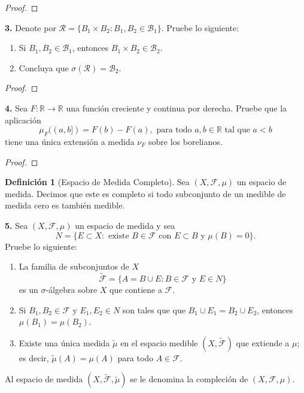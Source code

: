 \documentclass{article}
\newenvironment{statement}[1]{\smallskip\noindent\color[rgb]{1.00,0.00,0.50} {\bf #1.}}{}
\theoremstyle{definition}
\newtheorem{defn}[theorem]{Definici\'on}
\theoremstyle{remark}
\newcommand{\BR}{\mathbb R}
\begin{document}
\begin{proof}
\end{proof}

\begin{statement}{3}
  Denote por $\mathcal{R} = \{B_1 \times B_2 : B_1, B_2 \in \mathcal{B}_1\}$.
  Pruebe lo siguiente:
  \begin{enumerate}
    \item Si $B_1, B_2 \in \mathcal{B}_1$, entonces $B_1 \times B_2 \in \mathcal{B}_2$.
    \item Concluya que $\sigma(\mathcal{R}) = \mathcal{B}_2$.
  \end{enumerate}
\end{statement}

\begin{proof}
\end{proof}

\begin{statement}{4}
  Sea $F: \BR \to \BR$ una funci\'on creciente y continua por derecha.
  Pruebe que la aplicaci\'on
  \[
    \mu_F((a, b]) = F(b) - F(a), \text{ para todo } a, b \in \BR \text{ tal que } a < b
  \]
  tiene una \'unica extensi\'on a medida $\nu_F$ sobre los borelianos.
\end{statement}

\begin{proof}
\end{proof}

\begin{defn}[Espacio de Medida Completo]
  Sea $(X, \mathcal{F}, \mu)$ un espacio de medida. Decimos que este es completo
  si todo subconjunto de un medible de medida cero es tambi\'en medible.
\end{defn}

\begin{statement}{5}
  Sea $(X, \mathcal{F}, \mu)$ un espacio de medida y sea
  \[
    N = \{E \subset X : \text{ existe } B \in \mathcal{F} \text{ con }
    E \subset B \text{ y } \mu(B) = 0\}.
  \]
  Pruebe lo siguiente:
  \begin{enumerate}
    \item La familia de subconjuntos de $X$
    \[
      \widetilde{\mathcal{F}}= \{A = B \cup E : B \in \mathcal{F} \text{ y } E \in N\}  
    \]
    es un $\sigma$-\'algebra sobre $X$ que contiene a $\mathcal{F}$.
    \item Si $B_1, B_2 \in \mathcal{F}$ y $E_1, E_2 \in N$ son tales que
    que $B_1 \cup E_1 = B_2 \cup E_2$, entonces $\mu(B_1) = \mu(B_2)$.
    \item Existe una \'unica medida $\widetilde{\mu}$ en el espacio medible
    $(X, \widetilde{\mathcal{F}})$ que extiende a $\mu$; es decir,
    $\widetilde{\mu}(A) = \mu(A)$ para todo $A \in \mathcal{F}$.
  \end{enumerate}
  Al espacio de medida $(X, \widetilde{\mathcal{F}}, \widetilde{\mu})$ se le
  denomina la compleci\'on de $(X, \mathcal{F}, \mu)$.
\end{statement}
\end{document}
